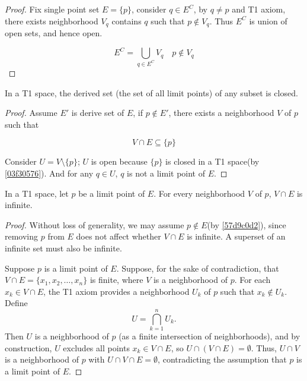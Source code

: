 \begin{proof}
    Fix single point set $ E = \{ p \}$, consider $q \in E^C$, by $q \ne p$ and T1 axiom, there exists neighborhood $V_q$
    contains $q$ such that $p \notin V_q$. Thus $E^C$ is union of open sets, and hence open.

    \[
        E^C = \bigcup_{q \in E^C} V_q \quad  p \notin V_q
    \]
\end{proof}

\begin{thm}
    In a T1 space, the derived set (the set of all limit points) of any subset is closed.
\end{thm}

\begin{proof}
    Assume $E'$ is derive set of $E$, if $p \notin E'$, there exists a neighborhood $V$ of $p$ such that 

    \[
        V \cap E \subseteq \{ p \}
    \]

    Consider $U = V \setminus \{ p \}$; $U$ is open because $\{ p \}$ is closed in a T1 space(by \cref{03f30576}). And for any $q \in U$, $q$ is not a limit point of $E$.
\end{proof}

\begin{thm}\label{2dc4936a}
    In a T1 space, let $p$ be a limit point of $E$. For every neighborhood $V$ of $p$, $V \cap E$ is infinite.
\end{thm}

\begin{proof}
    Without loss of generality, we may assume $p \notin E$(by \cref{57d9c0d2}), since removing $p$ from $E$ does not affect whether $V \cap E$ is infinite. 
    A superset of an infinite set must also be infinite. 

    Suppose $p$ is a limit point of $E$. 
    Suppose, for the sake of contradiction, that $V \cap E = \{x_1, x_2, \dots, x_n\}$ is finite, where $V$ is a neighborhood of $p$.
    For each $x_k \in V \cap E$, the T1 axiom provides a neighborhood $U_k$ of $p$ such that $x_k \notin U_k$. 
    Define
    \[
        U = \bigcap_{k=1}^n U_k.
    \]
    Then $U$ is a neighborhood of $p$ (as a finite intersection of neighborhoods), and by construction, $U$ excludes all points $x_k \in V \cap E$, so $U \cap (V \cap E) = \emptyset$. 
    Thus, $U \cap V$ is a neighborhood of $p$ with $U \cap V \cap E = \emptyset$, contradicting the assumption that $p$ is a limit point of $E$.
\end{proof}


